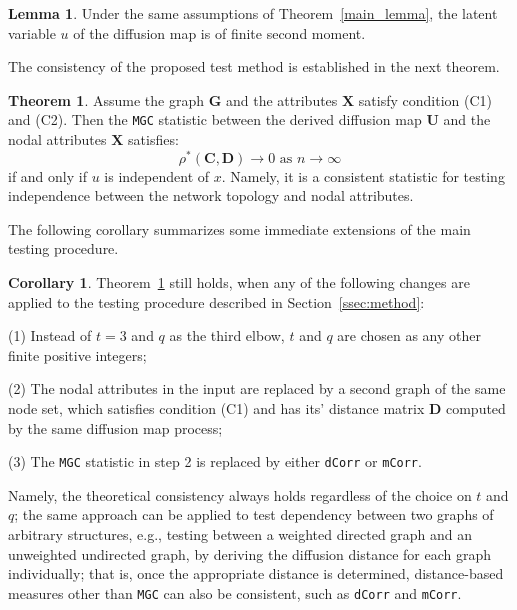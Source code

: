 \documentclass[12pt]{article}
\theoremstyle{definition}
\newtheorem{theorem}{Theorem}
\newtheorem{corollary}{Corollary}
\newtheorem{lemma}{Lemma}
\begin{document}
	\begin{lemma}
		\label{main_lemma_1}
		Under the same assumptions of Theorem~\ref{main_lemma}, the latent variable $u$ of the diffusion map is of finite second moment. 
	\end{lemma} 
	
	The consistency of the proposed test method is established in the next theorem.
	
	\begin{theorem}
		Assume the graph $\mathbf{G}$ and the attributes $\mathbf{X}$ satisfy condition (C1) and (C2). Then the \texttt{MGC} statistic between the derived diffusion map $\mathbf{U}$ and the nodal attributes $\mathbf{X}$ satisfies:
		\begin{equation}
		\rho^{*}(\mathbf{C}, \mathbf{D}) \longrightarrow 0 \mbox{ as } n \rightarrow \infty
		\end{equation}
		if and only if $u$ is independent of $x$. Namely, it is a consistent statistic for testing independence between the network topology and nodal attributes.
		\label{theoremMain}
	\end{theorem} 
	
	The following corollary summarizes some immediate extensions of the main testing procedure.
	
	\begin{corollary}
		\label{main_corollary}
		Theorem~\ref{theoremMain} still holds, when any of the following changes are applied to the testing procedure described in Section~\ref{ssec:method}:
		\begin{description}[align=left]
			\item [] (1) Instead of $t=3$ and $q$ as the third elbow, $t$ and $q$ are chosen as any other finite positive integers;
			
			\item [] (2) The nodal attributes in the input are replaced by a second graph of the same node set, which satisfies condition (C1) and has its' distance matrix $\mathbf{D}$ computed by the same diffusion map process;
			
			\item [] (3) The \texttt{MGC} statistic in step 2 is replaced by either \texttt{dCorr} or \texttt{mCorr}.
		\end{description}
	\end{corollary}
	
	Namely, the theoretical consistency always holds regardless of the choice on $t$ and $q$; the same approach can be applied to test dependency between two graphs of arbitrary structures, e.g., testing between a weighted directed graph and an unweighted undirected graph, by deriving the diffusion distance for each graph individually; that is, once the appropriate distance is determined, distance-based measures other than \texttt{MGC} can also be consistent, such as \texttt{dCorr} and \texttt{mCorr}. 
	
\end{document}
